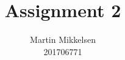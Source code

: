 \documentclass[a4paper,oneside]{memoir}
\begin{document}
\author{Martin Mikkelsen \\  
201706771 \\ }
\title{Assignment 2}
\maketitle

\thispagestyle{firststyle}
\end{document}
